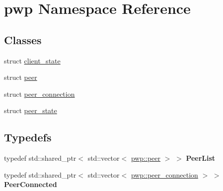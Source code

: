 \hypertarget{namespacepwp}{}\section{pwp Namespace Reference}
\label{namespacepwp}
\subsection*{Classes}
\begin{DoxyCompactItemize}
\item 
struct \hyperlink{structpwp_1_1client__state}{client\+\_\+state}
\item 
struct \hyperlink{structpwp_1_1peer}{peer}
\item 
struct \hyperlink{structpwp_1_1peer__connection}{peer\+\_\+connection}
\item 
struct \hyperlink{structpwp_1_1peer__state}{peer\+\_\+state}
\end{DoxyCompactItemize}
\subsection*{Typedefs}
\begin{DoxyCompactItemize}
\item 
\mbox{\label{namespacepwp_ad07fa6df116b205302ad5ec172277184}} 
typedef std\+::shared\+\_\+ptr$<$ std\+::vector$<$ \hyperlink{structpwp_1_1peer}{pwp\+::peer} $>$ $>$ {\bfseries Peer\+List}
\item 
\mbox{\label{namespacepwp_a174e8f020062fa10258b0d28f00d79ff}} 
typedef std\+::shared\+\_\+ptr$<$ std\+::vector$<$ \hyperlink{structpwp_1_1peer__connection}{pwp\+::peer\+\_\+connection} $>$ $>$ {\bfseries Peer\+Connected}
\end{DoxyCompactItemize}
